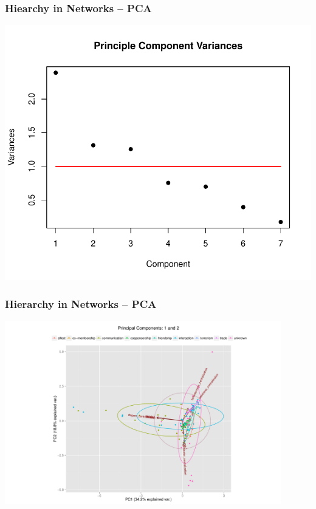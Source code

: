 \documentclass[xcolor={table}]{beamer}
\newenvironment{changemargin}[2]{%
  \begin{list}{}{%
    \setlength{\topsep}{0pt}%
    \setlength{\leftmargin}{#1}%
    \setlength{\rightmargin}{#2}%
    \setlength{\listparindent}{\parindent}%
    \setlength{\itemindent}{\parindent}%
    \setlength{\parsep}{\parskip}%
  }%
  \item[]}{\end{list}}
\begin{document}
\begin{frame}\frametitle{Hiearchy in Networks -- PCA}
\begin{changemargin}{-2cm}{ -2cm}
		\centering
		\includegraphics[scale = 0.6]{images/Observed_PCA_Component_Varinces.pdf}
\end{changemargin}
\end{frame}

\begin{frame}\frametitle{Hierarchy in Networks -- PCA}
	\begin{changemargin}{-2cm}{ -2cm}
		\centering
		\includegraphics[width=12cm, height=8cm]{images/Observed_PCA_Components1_2.pdf}
	\end{changemargin}
\end{frame}
\end{document}

